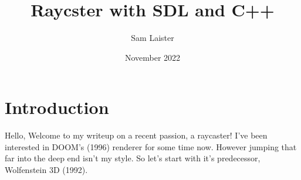 \documentclass{article}
\title{Raycster with SDL and C++}
\author{Sam Laister}
\date{November 2022}
\begin{document}
\maketitle

\section{Introduction}
Hello, Welcome to my writeup on a recent passion, a raycaster! I've been interested in
DOOM's (1996) renderer for some time now. However jumping that far into the deep end
isn't my style. So let's start with it's predecessor, Wolfenstein 3D (1992).
\end{document}
